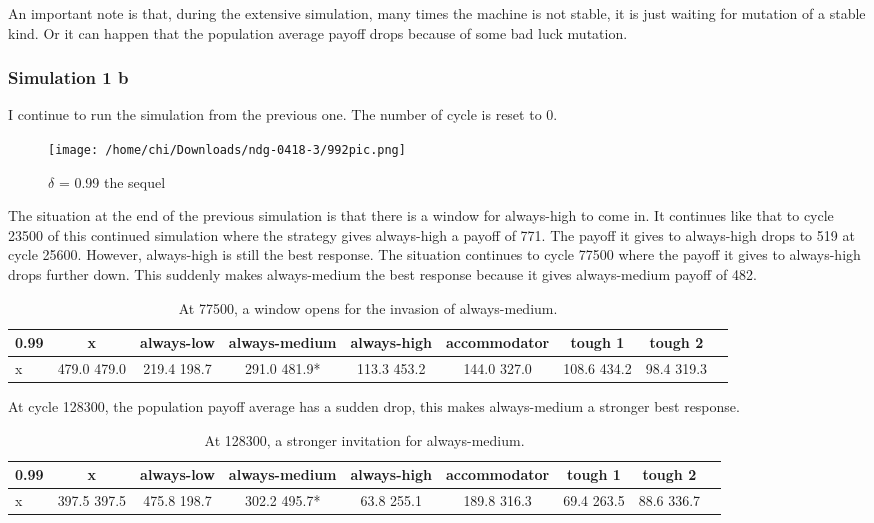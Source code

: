 \documentclass[12.5pt]{report}
\begin{document}
An important note is that, during the extensive simulation, many times the machine is not stable, it is just waiting for mutation of a stable kind. Or it can happen that the population average payoff drops because of some bad luck mutation.\\


\subsubsection{Simulation 1 b}

I continue to run the simulation from the previous one. The number of cycle is reset to 0.

\begin{figure}[h!]
\center
\texttt{[image: /home/chi/Downloads/ndg-0418-3/992pic.png]}
\caption{$\delta$ = 0.99 the sequel}
\end{figure}

The situation at the end of the previous simulation is that there is a window for always-high to come in. It continues like that to cycle 23500 of this continued simulation where the strategy gives always-high a payoff of 771. The payoff it gives to always-high drops to 519 at cycle 25600. However, always-high is still the best response. The situation continues to cycle 77500 where the payoff it gives to always-high drops further down. This suddenly makes always-medium the best response because it gives always-medium payoff of 482.


\begin{table}[h!]
\center
\begin{tabular}{l|cccccccc}
\textbf{0.99}& x & always-low & always-medium & always-high & accommodator &tough 1 & tough 2\\
\hline
x& 479.0 479.0 &   219.4 198.7   & 291.0 481.9*  & 113.3 453.2&    144.0 327.0  &  108.6 434.2 &   98.4 319.3 \\
\end{tabular}
\caption{At 77500, a window opens for the invasion of always-medium.}
\end{table}

At cycle 128300, the population payoff average has a sudden drop, this makes always-medium a stronger best response.
\begin{table}[h!]
\center
\begin{tabular}{l|cccccccc}
\textbf{0.99}& x & always-low & always-medium & always-high & accommodator &tough 1 & tough 2\\
\hline
x &397.5 397.5   & 475.8 198.7  &  302.2 495.7* &  63.8 255.1  &   189.8 316.3 &   69.4 263.5 &    88.6 336.7\\
\end{tabular}
\caption{At 128300, a stronger invitation for always-medium.}
\end{table}
\end{document}
